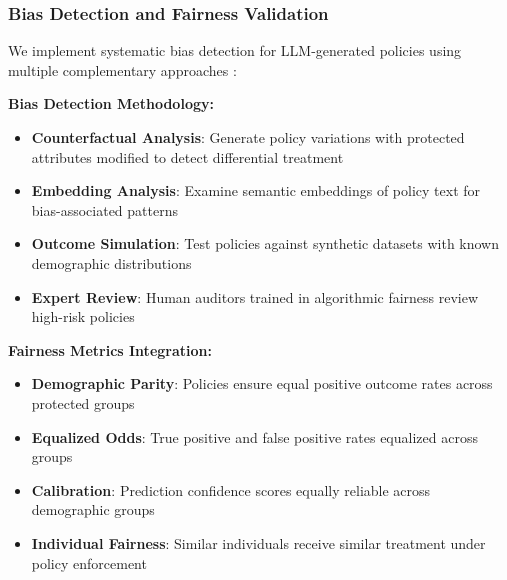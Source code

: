 \documentclass[sigconf,natbib]{acmart}
\begin{document}
\subsubsection{Bias Detection and Fairness Validation}
\label{subsubsec:bias_detection_evaluation}

We implement systematic bias detection for LLM-generated policies using multiple complementary approaches \cite{Mehrabi2021BiasAI}:

\textbf{Bias Detection Methodology:}
\begin{itemize}
    \item \textbf{Counterfactual Analysis}: Generate policy variations with protected attributes modified to detect differential treatment
    \item \textbf{Embedding Analysis}: Examine semantic embeddings of policy text for bias-associated patterns
    \item \textbf{Outcome Simulation}: Test policies against synthetic datasets with known demographic distributions
    \item \textbf{Expert Review}: Human auditors trained in algorithmic fairness review high-risk policies
\end{itemize}

\textbf{Fairness Metrics Integration:}
\begin{itemize}
    \item \textbf{Demographic Parity}: Policies ensure equal positive outcome rates across protected groups
    \item \textbf{Equalized Odds}: True positive and false positive rates equalized across groups
    \item \textbf{Calibration}: Prediction confidence scores equally reliable across demographic groups
    \item \textbf{Individual Fairness}: Similar individuals receive similar treatment under policy enforcement
\end{itemize}
\end{document}
